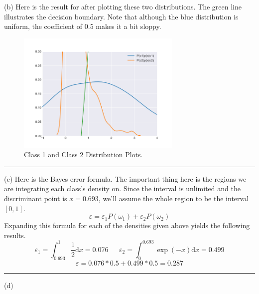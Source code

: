 \documentclass[12pt]{article}
\numberwithin{equation}{section}
\numberwithin{table}{section}
\numberwithin{figure}{section}
\newcommand{\eps}{\varepsilon}
\begin{document}
(b) Here is the result for after plotting these two distributions. The green line illustrates the decision boundary. Note that although the blue distribution is uniform, the coefficient of 0.5 makes it a bit sloppy.
\begin{figure}[!h]\centering
	\includegraphics[width=0.7\textwidth]{5_2.png}
	\caption{Class 1 and Class 2 Distribution Plots.}
	\label{pl1}
\end{figure}

\noindent\rule{\textwidth}{.5pt}
(c) Here is the Bayes error formula. The important thing here is the regions we are integrating each class's density on. Since the interval is unlimited and the discriminant point is $x=0.693$, we'll assume the whole region to be the interval $[0, 1]$.
$$
	\eps = \eps_1P(\omega_1) + \eps_2P(\omega_2)
$$
Expanding this formula for each of the densities given above yields the following results. 
$$
	\eps_1 = \int_{0.693}^{1}\frac{1}{2}\mathrm{d}x=0.076 \ \ \ \ \ \ \ \eps_2 = \int_{0}^{0.693}\exp(-x)\mathrm{d}x =  0.499
$$
$$
	\eps = 0.076 * 0.5 + 0.499 * 0.5 = 0.287
$$

\noindent\rule{\textwidth}{.5pt}
(d)
\end{document}

